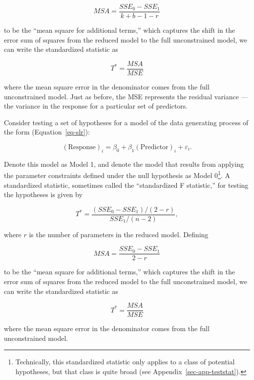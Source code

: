 \documentclass[
  letterpaper,
  DIV=11,
  numbers=noendperiod]{scrreprt}
\providecommand{\tightlist}{%
  \setlength{\itemsep}{0pt}\setlength{\parskip}{0pt}}\usepackage{longtable,booktabs,array}
\theoremstyle{plain}
\theoremstyle{definition}
\theoremstyle{definition}
\theoremstyle{remark}
\begin{document}
\[MSA = \frac{SSE_0 - SSE_1}{k + b - 1 - r}\]

to be the ``mean square for additional terms,'' which captures the shift
in the error sum of squares from the reduced model to the full
unconstrained model, we can write the standardized statistic as

\[T^* = \frac{MSA}{MSE}\]

where the mean square error in the denominator comes from the full
unconstrained model. Just as before, the MSE represents the residual
variance --- the variance in the response for a particular set of
predictors.

\begin{description}
\tightlist
\item[Standardized Statistic for Simple Linear Regression
(Definition~\ref{def-standard-f})]
Consider testing a set of hypotheses for a model of the data generating
process of the form (Equation~\ref{eq-slr}):
\end{description}

\[(\text{Response})_i = \beta_0 + \beta_1(\text{Predictor})_i + \varepsilon_i.\]

Denote this model as Model 1, and denote the model that results from
applying the parameter constraints defined under the null hypothesis as
Model 0\footnote{Technically, this standardized statistic only applies
  to a class of potential hypotheses, but that class is quite broad (see
  Appendix~\ref{sec-app-teststat}).}. A standardized statistic,
sometimes called the ``standardized F statistic,'' for testing the
hypotheses is given by

\[T^* = \frac{\left(SSE_0 - SSE_1\right) / (2 - r)}{SSE_1 / (n - 2)},\]

where \(r\) is the number of parameters in the reduced model. Defining

\[MSA = \frac{SSE_0 - SSE_1}{2 - r}\]

to be the ``mean square for additional terms,'' which captures the shift
in the error sum of squares from the reduced model to the full
unconstrained model, we can write the standardized statistic as

\[T^* = \frac{MSA}{MSE}\]

where the mean square error in the denominator comes from the full
unconstrained model.
\end{document}
